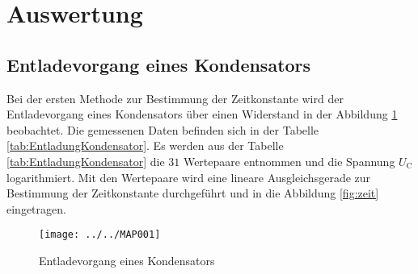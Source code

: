 \section{Auswertung}
\label{sec:Auswertung}
\subsection{Entladevorgang eines Kondensators}
Bei der ersten Methode zur Bestimmung der Zeitkonstante wird der Entladevorgang eines Kondensators über einen Widerstand in der Abbildung \ref{fig:map001} beobachtet. Die gemessenen Daten befinden sich in der Tabelle \ref{tab:EntladungKondensator}. Es werden aus der Tabelle \ref{tab:EntladungKondensator} die $31$ Wertepaare entnommen und die Spannung $U_\text{C}$ logarithmiert. 
Mit den Wertepaare  wird eine lineare Ausgleichsgerade zur Bestimmung der Zeitkonstante durchgeführt und in die Abbildung \ref{fig:zeit} eingetragen. 
\begin{figure}[h!]
	\centering
	\texttt{[image: ../../MAP001]}
	\caption{Entladevorgang eines Kondensators}
	\label{fig:map001}
\end{figure}

